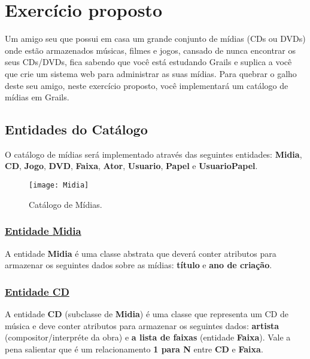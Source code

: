 
\chapter*{Exercício proposto}

Um amigo seu que possui em casa  um grande conjunto de mídias (CDs ou DVDs) onde
estão armazenados  músicas, filmes e jogos,  cansado de nunca  encontrar os seus
CDs/DVDs, fica sabendo que você está  estudando Grails e suplica a você que crie
um sistema web para administrar as  suas mídias.  Para quebrar o galho deste seu
amigo,  neste exercício  proposto, você  implementará um  catálogo de  mídias em
Grails.

\section*{Entidades do Catálogo}

\vspace{0.3cm}

O catálogo  de mídias  será implementado através  das seguintes  entidades: {\bf
  Midia},  {\bf  CD}, {\bf  Jogo},  {\bf DVD},  {\bf  Faixa},  {\bf Ator},  {\bf
  Usuario}, {\bf Papel} e {\bf UsuarioPapel}. 

\begin{figure}[htbp]
\centering\texttt{[image: Midia]}
\caption{Catálogo de Mídias.}
\label{MidiaFig}
\end{figure}

\subsection*{\underline{Entidade {\bf Midia}}}

A entidade  {\bf Midia} é uma  classe abstrata que deverá  conter atributos para
armazenar  os seguintes  dados  sobre as  mídias:  {\bf título}  e  {\bf ano  de
  criação}.

\subsection*{\underline{Entidade {\bf CD}}}

A entidade {\bf CD} (subclasse de {\bf Midia}) é uma classe que representa um CD
de  música e  deve  conter atributos  para  armazenar os  seguintes dados:  {\bf
  artista} (compositor/interpréte da  obra) e {\bf a lista  de faixas} (entidade
{\bf Faixa}). Vale a pena salientar que é um relacionamento {\bf 1 para N} entre
{\bf CD} e {\bf Faixa}.

